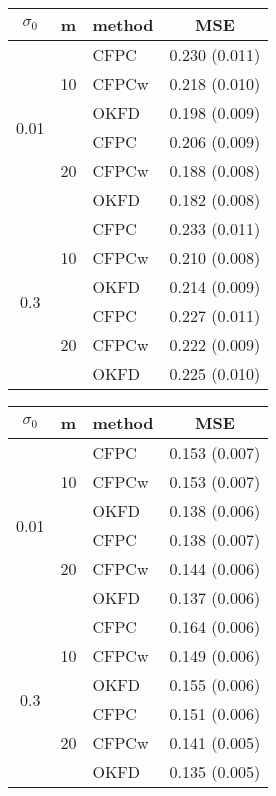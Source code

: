 \begin{table}
	\begin{center}
		\begin{tabular}
			{|c|c|l|c|} \hline $\sigma_0$ & m & method & MSE \\
			\hline \multirow{6}{*}{0.01}& \multirow{3}{*}{10}
			  &CFPC&  0.230  (0.011)  \\
			& &CFPCw& 0.218  (0.010)  \\
			& &OKFD& 0.198  (0.009) \\
			\cline{2-4} & \multirow{3}{*}{20}
			  &CFPC& 0.206  (0.009) \\
			& &CFPCw&  0.188  (0.008)  \\
			& &OKFD& 0.182  (0.008)  \\
			\hline \multirow{6}{*}{0.3}& \multirow{3}{*}{10}
			  &CFPC& 0.233  (0.011)   \\
			& &CFPCw& 0.210  (0.008) \\
			& &OKFD& 0.214  (0.009)  \\
			\cline{2-4} & \multirow{3}{*}{20}
			  &CFPC& 0.227  (0.011)  \\
			& &CFPCw& 0.222  (0.009)  \\
			& &OKFD& 0.225  (0.010)  \\
			\hline
		\end{tabular}
	\label{tab:kriging_pred}
	\end{center}
\end{table}

\begin{table}
	\begin{center}
		\begin{tabular}{|c|c|l|c|} \hline
			$\sigma_0$ & m & method & MSE \\
			\hline
			\multirow{6}{*}{0.01}& \multirow{3}{*}{10}
			  &CFPC&  0.153  (0.007)  \\
			& &CFPCw& 0.153  (0.007)  \\
			& &OKFD& 0.138  (0.006) \\
			\cline{2-4} & \multirow{3}{*}{20}
			  &CFPC& 0.138  (0.007) \\
			& &CFPCw&  0.144  (0.006)  \\
			& &OKFD& 0.137  (0.006) \\
			\hline \multirow{6}{*}{0.3}& \multirow{3}{*}{10}
			  &CFPC& 0.164  (0.006)  \\
			& &CFPCw& 0.149  (0.006) \\
			& &OKFD& 0.155  (0.006) \\
			\cline{2-4} & \multirow{3}{*}{20}
			  &CFPC& 0.151  (0.006)  \\
			& &CFPCw& 0.141  (0.005) \\
			& &OKFD& 0.135  (0.005)  \\
			\hline
		\end{tabular}
	\label{tab:kriging_pred_2}
	\end{center}
\end{table}

